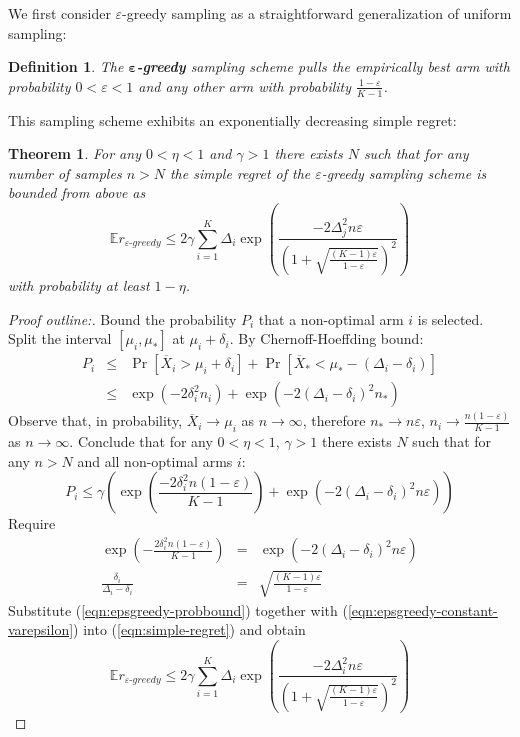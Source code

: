 \documentclass[letterpaper]{article}
\newcommand {\IE} {\ensuremath {\mathbb{E}}}
\newtheorem{dfn}{Definition}
\newtheorem{thm}{Theorem}
\begin{document}
We first consider $\varepsilon$-greedy sampling as a straightforward
generalization of uniform sampling:
\begin{dfn} The \textbf{$\mathbf{\varepsilon}$-greedy} sampling scheme
pulls the empirically best arm with probability
$0<\varepsilon<1$ and any other
arm with probability $\frac {1-\varepsilon} {K-1}$. 
\end{dfn}
This sampling scheme exhibits an exponentially decreasing simple regret:
\begin{thm} For any $0<\eta<1$  and $\gamma>1$ there exists $N$ such that for
  any number of samples $n>N$ the simple regret of the  $\varepsilon$-greedy
sampling scheme is  bounded from above as
\begin{equation}
\IE r_{\varepsilon\mbox{-}greedy}\le 2\gamma \sum_{i=1}^K\Delta_i\exp\left(\frac {-2\Delta_j^2n\varepsilon}
  {\left(1+\sqrt{\frac {(K-1)\varepsilon}
        {1-\varepsilon}}\right)^2}\right)
\end{equation}
with probability at least $1-\eta$.
\end{thm}

\begin{proof}[Proof outline:] 

Bound the probability $P_i$ that a non-optimal arm $i$ is selected. Split the interval
 $[\mu_i, \mu_*]$ at $\mu_i+\delta_i$. By Chernoff-Hoeffding bound:
\begin{eqnarray}
P_i&\le&\Pr[\overline X_i>\mu_i+\delta_i]+\Pr[\overline X_*<\mu_*-(\Delta_i-\delta_i)]\nonumber\\
   &\le&\exp\left(-2\delta_i^2n_i\right)+\exp\left(-2(\Delta_i-\delta_i)^2n_*\right)
\end{eqnarray}
Observe that, in probability, $\overline X_i \rightarrow \mu_i$ as $n\rightarrow\infty$, 
therefore $n_*\rightarrow n\varepsilon$, $n_i\rightarrow\frac
{n(1-\varepsilon)} {K-1}$ as $n\rightarrow \infty$. Conclude that for
any $0<\eta<1$, $\gamma>1$ there exists $N$ such that for any $n>N$ and
all non-optimal arms $i$:
\begin{equation}
P_i \le \gamma \left(\exp\left(\frac {-2\delta_i^2n(1-\varepsilon)}{K-1}\right)
+\exp\left(-2(\Delta_i-\delta_i)^2n\varepsilon\right)\right)
\label{eqn:epsgreedy-probbound}
\end{equation}
Require
\begin{eqnarray}
\exp\left(-\frac {2\delta_i^2n(1-\varepsilon)}{K-1}\right)
&=&\exp\left(-2(\Delta_i-\delta_i)^2n\varepsilon\right)\nonumber\\
\frac {\delta_i} {\Delta_i-\delta_i}&=&\sqrt{\frac {(K-1)\varepsilon} {1-\varepsilon}}
\label{eqn:epsgreedy-constant-varepsilon}
\end{eqnarray}
Substitute (\ref{eqn:epsgreedy-probbound}) together with
(\ref{eqn:epsgreedy-constant-varepsilon}) into
(\ref{eqn:simple-regret}) and obtain
\begin{equation}
\IE r_{\varepsilon\mbox{-}greedy}\le 2\gamma \sum_{i=1}^K\Delta_i\exp\left(\frac {-2\Delta_i^2n\varepsilon}
  {\left(1+\sqrt{\frac {(K-1)\varepsilon}
        {1-\varepsilon}}\right)^2}\right)
\end{equation}
\end{proof}
\end{document}
